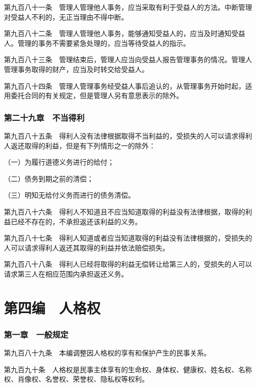 \documentclass[UTF8,12pt,a4paper]{ctexbook}
\begin{document}
第九百八十一条　管理人管理他人事务，应当采取有利于受益人的方法。中断管理对受益人不利的，无正当理由不得中断。

第九百八十二条　管理人管理他人事务，能够通知受益人的，应当及时通知受益人。管理的事务不需要紧急处理的，应当等待受益人的指示。

第九百八十三条　管理结束后，管理人应当向受益人报告管理事务的情况。管理人管理事务取得的财产，应当及时转交给受益人。

第九百八十四条　管理人管理事务经受益人事后追认的，从管理事务开始时起，适用委托合同的有关规定，但是管理人另有意思表示的除外。

\section*{第二十九章　不当得利}

第九百八十五条　得利人没有法律根据取得不当利益的，受损失的人可以请求得利人返还取得的利益，但是有下列情形之一的除外：

（一）为履行道德义务进行的给付；

（二）债务到期之前的清偿；

（三）明知无给付义务而进行的债务清偿。

第九百八十六条　得利人不知道且不应当知道取得的利益没有法律根据，取得的利益已经不存在的，不承担返还该利益的义务。

第九百八十七条　得利人知道或者应当知道取得的利益没有法律根据的，受损失的人可以请求得利人返还其取得的利益并依法赔偿损失。

第九百八十八条　得利人已经将取得的利益无偿转让给第三人的，受损失的人可以请求第三人在相应范围内承担返还义务。

\cleardoublepage
{}
\part*{第四编　人格权}

\section*{第一章　一般规定}

第九百八十九条　本编调整因人格权的享有和保护产生的民事关系。

第九百九十条　人格权是民事主体享有的生命权、身体权、健康权、姓名权、名称权、肖像权、名誉权、荣誉权、隐私权等权利。
\end{document}
